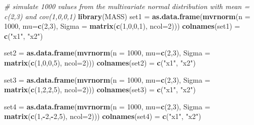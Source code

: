 \documentclass[]{article}
\newenvironment{Shaded}{\begin{snugshade}}{\end{snugshade}}
\newcommand{\CommentTok}[1]{\textcolor[rgb]{0.56,0.35,0.01}{\textit{#1}}}
\newcommand{\DataTypeTok}[1]{\textcolor[rgb]{0.13,0.29,0.53}{#1}}
\newcommand{\DecValTok}[1]{\textcolor[rgb]{0.00,0.00,0.81}{#1}}
\newcommand{\KeywordTok}[1]{\textcolor[rgb]{0.13,0.29,0.53}{\textbf{#1}}}
\newcommand{\NormalTok}[1]{#1}
\newcommand{\OperatorTok}[1]{\textcolor[rgb]{0.81,0.36,0.00}{\textbf{#1}}}
\newcommand{\StringTok}[1]{\textcolor[rgb]{0.31,0.60,0.02}{#1}}
\begin{document}
\begin{Shaded}
\begin{Highlighting}[]
\CommentTok{# simulate 1000 values from the multivariate normal distribution with mean = c(2,3) and cov(1,0,0,1)}
\KeywordTok{library}\NormalTok{(MASS)}
\NormalTok{set1 =}\StringTok{ }\KeywordTok{as.data.frame}\NormalTok{(}\KeywordTok{mvrnorm}\NormalTok{(}\DataTypeTok{n =} \DecValTok{1000}\NormalTok{, }\DataTypeTok{mu=}\KeywordTok{c}\NormalTok{(}\DecValTok{2}\NormalTok{,}\DecValTok{3}\NormalTok{), }\DataTypeTok{Sigma =} \KeywordTok{matrix}\NormalTok{(}\KeywordTok{c}\NormalTok{(}\DecValTok{1}\NormalTok{,}\DecValTok{0}\NormalTok{,}\DecValTok{0}\NormalTok{,}\DecValTok{1}\NormalTok{), }\DataTypeTok{ncol=}\DecValTok{2}\NormalTok{)))}
\KeywordTok{colnames}\NormalTok{(set1) =}\StringTok{ }\KeywordTok{c}\NormalTok{(}\StringTok{"x1"}\NormalTok{, }\StringTok{"x2"}\NormalTok{)}

\NormalTok{set2 =}\StringTok{ }\KeywordTok{as.data.frame}\NormalTok{(}\KeywordTok{mvrnorm}\NormalTok{(}\DataTypeTok{n =} \DecValTok{1000}\NormalTok{, }\DataTypeTok{mu=}\KeywordTok{c}\NormalTok{(}\DecValTok{2}\NormalTok{,}\DecValTok{3}\NormalTok{), }\DataTypeTok{Sigma =} \KeywordTok{matrix}\NormalTok{(}\KeywordTok{c}\NormalTok{(}\DecValTok{1}\NormalTok{,}\DecValTok{0}\NormalTok{,}\DecValTok{0}\NormalTok{,}\DecValTok{5}\NormalTok{), }\DataTypeTok{ncol=}\DecValTok{2}\NormalTok{)))}
\KeywordTok{colnames}\NormalTok{(set2) =}\StringTok{ }\KeywordTok{c}\NormalTok{(}\StringTok{"x1"}\NormalTok{, }\StringTok{"x2"}\NormalTok{)}

\NormalTok{set3 =}\StringTok{ }\KeywordTok{as.data.frame}\NormalTok{(}\KeywordTok{mvrnorm}\NormalTok{(}\DataTypeTok{n =} \DecValTok{1000}\NormalTok{, }\DataTypeTok{mu=}\KeywordTok{c}\NormalTok{(}\DecValTok{2}\NormalTok{,}\DecValTok{3}\NormalTok{), }\DataTypeTok{Sigma =} \KeywordTok{matrix}\NormalTok{(}\KeywordTok{c}\NormalTok{(}\DecValTok{1}\NormalTok{,}\DecValTok{2}\NormalTok{,}\DecValTok{2}\NormalTok{,}\DecValTok{5}\NormalTok{), }\DataTypeTok{ncol=}\DecValTok{2}\NormalTok{)))}
\KeywordTok{colnames}\NormalTok{(set3) =}\StringTok{ }\KeywordTok{c}\NormalTok{(}\StringTok{"x1"}\NormalTok{, }\StringTok{"x2"}\NormalTok{)}

\NormalTok{set4 =}\StringTok{ }\KeywordTok{as.data.frame}\NormalTok{(}\KeywordTok{mvrnorm}\NormalTok{(}\DataTypeTok{n =} \DecValTok{1000}\NormalTok{, }\DataTypeTok{mu=}\KeywordTok{c}\NormalTok{(}\DecValTok{2}\NormalTok{,}\DecValTok{3}\NormalTok{), }\DataTypeTok{Sigma =} \KeywordTok{matrix}\NormalTok{(}\KeywordTok{c}\NormalTok{(}\DecValTok{1}\NormalTok{,}\OperatorTok{-}\DecValTok{2}\NormalTok{,}\OperatorTok{-}\DecValTok{2}\NormalTok{,}\DecValTok{5}\NormalTok{), }\DataTypeTok{ncol=}\DecValTok{2}\NormalTok{)))}
\KeywordTok{colnames}\NormalTok{(set4) =}\StringTok{ }\KeywordTok{c}\NormalTok{(}\StringTok{"x1"}\NormalTok{, }\StringTok{"x2"}\NormalTok{)}
\end{Highlighting}
\end{Shaded}
\end{document}
